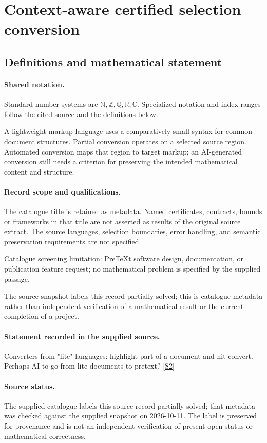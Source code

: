 \documentclass[11pt]{article}
\newcommand{\sref}[2]{\hyperlink{source:#1:#2}{[S#2]}}
\begin{document}
\section{Context-aware certified selection conversion}\label{statement}

\subsection{Definitions and mathematical statement}

\paragraph{Shared notation.}Standard number systems are $\mathbb N,\mathbb Z,\mathbb Q,\mathbb R,\mathbb C$. Specialized notation and index ranges follow the cited source and the definitions below.


A lightweight markup language uses a comparatively small syntax for common document structures. Partial conversion operates on a selected source region. Automated conversion maps that region to target markup; an AI-generated conversion still needs a criterion for preserving the intended mathematical content and structure.
\paragraph{Record scope and qualifications.}
The catalogue title is retained as metadata. Named certificates, contracts, bounds or frameworks in that title are not asserted as results of the original source extract.
The source languages, selection boundaries, error handling, and semantic preservation requirements are not specified.

Catalogue screening limitation: PreTeXt software design, documentation, or publication feature request; no mathematical problem is specified by the supplied passage.

The source snapshot labels this record partially solved; this is catalogue metadata rather than independent verification of a mathematical result or the current completion of a project.
\paragraph{Statement recorded in the supplied source.}
Converters from "lite" languages: highlight part of a document and hit convert. Perhaps AI to go from lite documents to pretext? \sref{statement}{2}
\paragraph{Source status.}
The supplied catalogue labels this source record partially solved; that metadata was checked against the supplied snapshot on 2026-10-11. The label is preserved for provenance and is not an independent verification of present open status or mathematical correctness.
\end{document}

